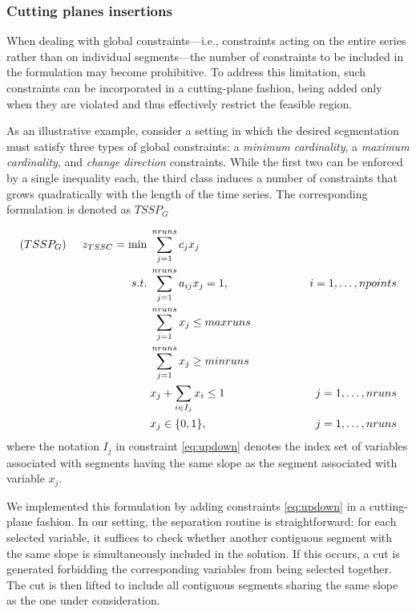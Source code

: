 \documentclass[preprints,article,submit,pdftex,moreauthors]{Definitions/mdpi}
\newcommand{\rev}[1]{{\color{blue}#1}}
\begin{document}
\rev{
	\subsubsection{Cutting planes insertions}
	
	When dealing with global constraints—i.e., constraints acting on the entire series rather than on individual segments—the number of constraints to be included in the formulation may become prohibitive. To address this limitation, such constraints can be incorporated in a cutting-plane fashion, being added only when they are violated and thus effectively restrict the feasible region.
	
	As an illustrative example, consider a setting in which the desired segmentation must satisfy three types of global constraints: a {\it minimum cardinality}, a {\it maximum cardinality}, and {\it change direction} constraints. While the first two can be enforced by a single inequality each, the third class induces a number of constraints that grows quadratically with the length of the time series. The corresponding formulation is denoted as $TSSP_G$
	
	\begin{alignat}{4}
		(TSSP_G) \hspace{0.5cm} z_{TSSC} = \min     &\; \sum_{j=1}^{nruns} c_j x_{j}  \label{eq:SCPobjG} \\
		s.t. &\; \sum_{j=1}^{nruns}a_{ij}x_{j} = 1, & \hspace{1.5cm} i=1,\dots,npoints  \label{eq:SCPcovG} \\
		&\; \sum_{j=1}^{nruns} x_{j} \leq maxruns \label{eq:SPPmaxG}\\
		&\; \sum_{j=1}^{nruns} x_{j} \geq minruns \label{eq:SPPminG}\\
		&\; x_j + \sum_{i \in I_j} x_i \leq 1  & \hspace{1.5cm} j=1,\dots,nruns  \label{eq:updown}\\
		&\; x_j \in \{0,1\},                   &\; j=1,\dots,nruns  \label{eq:SCPvarG}
	\end{alignat}
	\noindent where the notation $I_j$ in constraint \ref{eq:updown} denotes the index set of variables associated with segments having the same slope as the segment associated with variable $x_j$.
	
	We implemented this formulation by adding constraints \ref{eq:updown} in a cutting-plane fashion. In our setting, the separation routine is straightforward: for each selected variable, it suffices to check whether another contiguous segment with the same slope is simultaneously included in the solution. If this occurs, a cut is generated forbidding the corresponding variables from being selected together. The cut is then lifted to include all contiguous segments sharing the same slope as the one under consideration.
	
}
\end{document}
